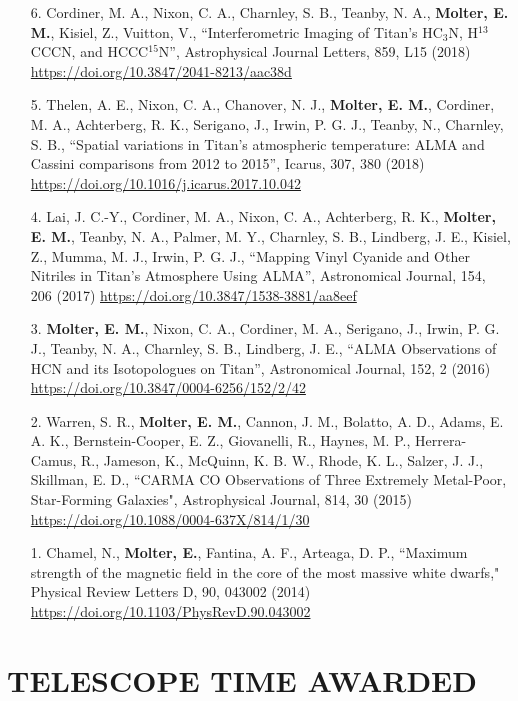 \documentclass[margin, 10pt]{res} %
\begin{document}
\begin{resume}
{\begin{enumerate}
\item[6.] Cordiner, M. A., Nixon, C. A., Charnley, S. B., Teanby, N. A., {\bf Molter, E. M.}, Kisiel, Z., Vuitton, V., ``Interferometric Imaging of Titan's HC$_3$N, H$^{13}$\textrm{CCC}N, and HCCC$^{15}$N'', Astrophysical Journal Letters, 859, L15 (2018) \url{https://doi.org/10.3847/2041-8213/aac38d}

\item[5.] Thelen, A. E.,  Nixon, C. A., Chanover, N. J., {\bf Molter, E. M.}, Cordiner, M. A., Achterberg, R. K., Serigano, J., Irwin, P. G. J., Teanby, N., Charnley, S. B., ``Spatial variations in Titan's atmospheric temperature: ALMA and Cassini comparisons from 2012 to 2015'', Icarus, 307, 380 (2018) \url{https://doi.org/10.1016/j.icarus.2017.10.042}

\item[4.] Lai, J. C.-Y., Cordiner, M. A., Nixon, C. A., Achterberg, R. K., {\bf Molter, E. M.}, Teanby, N. A., Palmer, M. Y., Charnley, S. B., Lindberg, J. E., Kisiel, Z., Mumma, M. J., Irwin, P. G. J., ``Mapping Vinyl Cyanide and Other Nitriles in Titan’s Atmosphere Using ALMA'', Astronomical Journal, 154, 206 (2017) \url{https://doi.org/10.3847/1538-3881/aa8eef}

\item[3.] {\bf Molter, E. M.}, Nixon, C. A., Cordiner, M. A., Serigano, J., Irwin, P. G. J., Teanby, N. A., Charnley, S. B., Lindberg, J. E., ``ALMA Observations of
  HCN and its Isotopologues on Titan'', Astronomical Journal, 152, 2 (2016) \url{https://doi.org/10.3847/0004-6256/152/2/42}
  
\item[2.] Warren, S. R., {\bf Molter, E. M.}, Cannon, J. M., Bolatto, A. D., Adams, E. A. K., Bernstein-Cooper, E. Z., Giovanelli, R., Haynes, M. P., Herrera-Camus, R., Jameson, K., McQuinn, K. B. W., Rhode, K. L., Salzer, J. J., Skillman, E. D., ``CARMA
  CO Observations of Three Extremely Metal-Poor, Star-Forming
  Galaxies", Astrophysical Journal, 814, 30 (2015) \url{https://doi.org/10.1088/0004-637X/814/1/30}
  
\item[1.] Chamel, N., {\bf Molter, E.}, Fantina, A. F., Arteaga, D. P., ``Maximum strength of the magnetic field in the core of the most massive white dwarfs," Physical Review Letters D, 90, 043002 (2014) \url{https://doi.org/10.1103/PhysRevD.90.043002}
\end{enumerate}

}{}

\section{TELESCOPE TIME AWARDED}


\end{resume}
\end{document}
